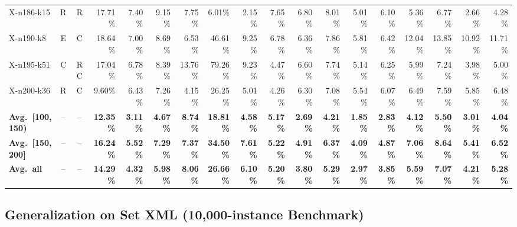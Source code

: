 \documentclass[letterpaper]{article} %
\begin{document}
\begin{landscape}
\begin{longtable}{@{}l c c r rr rrrr rr rr rr rr@{}}
X-n186-k15 & R & R & 17.71\% & 7.40\% & 9.15\% & 7.75\% & 6.01\% & 2.15\% & 7.65\% & 6.80\% & 8.01\% & 5.01\% & 6.10\% & 5.36\% & 6.77\% & 2.66\% & 4.28\% \\
X-n190-k8 & E & C & 18.64\% & 7.00\% & 8.69\% & 6.53\% & 46.61\% & 9.25\% & 6.78\% & 6.36\% & 7.86\% & 5.81\% & 6.42\% & 12.04\% & 13.85\% & 10.92\% & 11.71\% \\
X-n195-k51 & C & RC & 17.04\% & 6.78\% & 8.39\% & 13.76\% & 79.26\% & 9.23\% & 4.47\% & 6.60\% & 7.74\% & 5.14\% & 6.25\% & 5.99\% & 7.24\% & 3.98\% & 5.00\% \\
X-n200-k36 & R & C & 9.60\% & 6.43\% & 7.26\% & 4.15\% & 26.25\% & 5.01\% & 4.26\% & 6.30\% & 7.08\% & 5.54\% & 6.07\% & 6.49\% & 7.59\% & 5.85\% & 6.48\% \\
\midrule
\textbf{Avg.\ [100,150)} & -- & -- & \textbf{12.35\%} & \textbf{3.11\%} & \textbf{4.67\%} & \textbf{8.74\%} & \textbf{18.81\%} & \textbf{4.58\%} & \textbf{5.17\%} & \textbf{2.69\%} & \textbf{4.21\%} & \textbf{1.85\%} & \textbf{2.83\%} & \textbf{4.12\%} & \textbf{5.50\%} & \textbf{3.01\%} & \textbf{4.04\%} \\
\textbf{Avg.\ [150,200]} & -- & -- & \textbf{16.24\%} & \textbf{5.52\%} & \textbf{7.29\%} & \textbf{7.37\%} & \textbf{34.50\%} & \textbf{7.61\%} & \textbf{5.22\%} & \textbf{4.91\%} & \textbf{6.37\%} & \textbf{4.09\%} & \textbf{4.87\%} & \textbf{7.06\%} & \textbf{8.64\%} & \textbf{5.41\%} & \textbf{6.52\%} \\
\textbf{Avg.\ all} & -- & -- & \textbf{14.29\%} & \textbf{4.32\%} & \textbf{5.98\%} & \textbf{8.06\%} & \textbf{26.66\%} & \textbf{6.10\%} & \textbf{5.20\%} & \textbf{3.80\%} & \textbf{5.29\%} & \textbf{2.97\%} & \textbf{3.85\%} & \textbf{5.59\%} & \textbf{7.07\%} & \textbf{4.21\%} & \textbf{5.28\%} \\
\end{longtable}
\end{landscape}
\twocolumn

\subsection{Generalization on Set XML (10,000-instance Benchmark)}
\label{sec:xml_generalization}
\end{document}
